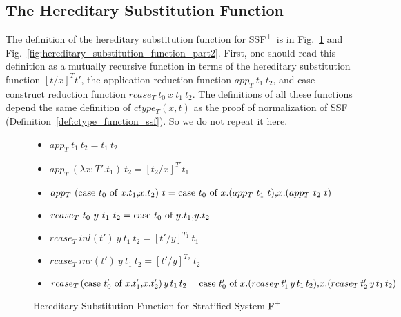 \subsection{The Hereditary Substitution Function}
\label{sec:the_hereditary_substitution_function_ssfp}

The definition of the hereditary substitution function for SS$\mbox{F}^{+}$ is
in Fig.~\ref{fig:hereditary_substitution_function_part1} and
Fig.~\ref{fig:hereditary_substitution_function_part2}.  First, one
should read this definition as a mutually recursive function in terms
of the hereditary substitution function $[t/x]^T t'$, the
application reduction function $app_T\ t_1\ t_2$, and case
construct reduction function $rcase_T\ t_0\ x\ t_1\ t_2$.  The
definitions of all these functions depend the same definition of
$ctype_T(x, t)$ as the proof of normalization of SSF
(Definition~\ref{def:ctype_function_ssf}).  So we do not repeat it
here.
\begin{figure} 
  \small
  \begin{itemize}
  \item[] $app_T\ t_1\ t_2 = t_1\ t_2$
    
  \item[] $app_T\ (\lambda x:T'.t_1)\ t_2 = [t_2/x]^{T'} t_1$
  \item[] $app_T\ (\mbox{case}\ t_0\ \text{of}\ x\text{.}t_1\text{,}x\text{.}t_2)\ t = 
    \mbox{case}\ t_0\ \text{of}\ x\text{.}(app_T\ t_1\ t)\text{,}x\text{.}(app_T\ t_2\ t)$
  \end{itemize}
  
  \begin{itemize}
  \item[] $rcase_{T}\ t_0\ y\ t_1\ t_2 = \mbox{case}\ t_0\ \text{of}\ y\text{.}t_1\text{,}y\text{.}t_2$
  \item[] $rcase_{T}\ inl(t')\ y\ t_1\ t_2 = [t'/y]^{T_1}\ t_1$
  \item[] $rcase_{T}\ inr(t')\ y\ t_1\ t_2 = [t'/y]^{T_2}\ t_2$
  \item[] $rcase_{T}\,(\mbox{case}\ t'_0\ \text{of}\ x\text{.}t'_1\text{,}x\text{.}t'_2)\,y\,t_1\,t_2 = 
    \mbox{case}\ t'_0\ \text{of}\ x\text{.}(rcase_{T}\,t'_1\,y\,t_1\,t_2)\text{,}x\text{.}(rcase_{T}\,t'_2\,y\,t_1\,t_2)$
  \end{itemize}
  \caption{Hereditary Substitution Function for Stratified System $\mbox{F}^{+}$}
  \label{fig:hereditary_substitution_function_part1}
\end{figure}

